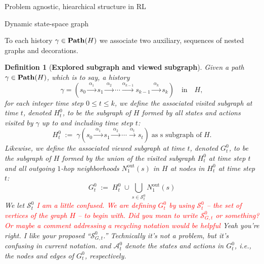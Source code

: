 \documentclass[11pt]{article}
\newtheorem{definition}[subsubsection]{Definition}
\begin{document}
\begin{section}{Problem agnostic, hiearchical structure in RL}

\begin{subsection}{Dynamic state-space graph}

To each history $\gamma\in\bold{Path}(H)$ we associate two auxiliary, sequences of nested graphs and decorations.

\begin{definition}[{\bf Explored subgraph and viewed subgraph}]
\normalfont
Given a path $\gamma\in\bold{Path}(H)$, which is to say, a history
\begin{equation}\label{eq: gamma history}
\gamma=\left(s_{0}\xrightarrow{\ \alpha_{1}\ }s_{1}\xrightarrow{\ \alpha_{2}\ }\cdots\xrightarrow{\alpha_{k-1}}s_{k-1}\xrightarrow{\ \alpha_{k}\ }s_{k}\right)\quad\text{in}\quad H,
\end{equation}
for each integer time step $0\le t\le k$, we define the associated {\em visited subgraph at time $t$}, denoted $H^{0}_{t}$, to be the subgraph of $H$ formed by all states and actions visited by $\gamma$ up to and including time step $t$:
$$
H^{0}_{t}\;:=\;\gamma\left(s_{0}\xrightarrow{\ \alpha_{1}\ }s_{1}\xrightarrow{\ \alpha_{2}\ }\cdots\xrightarrow{\ \alpha_{t}\ }s_{t}\right)\;\text{as s subgraph of}\;H.
$$
Likewise, we define the associated {\em viewed subgraph at time $t$}, denoted $G^{0}_{t}$, to be the subgraph of $H$ formed by the union of the visited subgraph $H^{0}_{t}$ at time step $t$ and all outgoing $1$-hop neighborhoods $N^{\text{out}\!}_{1}(s)$ in $H$ at nodes in $H^{0}_{t}$ at time step $t$:
$$
G^{0}_{t}
\;:=\;
H^{0}_{t}\;\cup\bigcup_{s\in \mathcal{S}^{0}_{t}}
\!\!N^{\text{out}\!}_{1}(s)
$$
We let $\mathcal{S}^{0}_{t}$ \textcolor{red}{I am a little confused. We are defining $G^0_t$ by using $\mathcal{S}^0_t$ -- the set of vertices of the graph $H$ -- to begin with. Did you mean to write $\mathcal{S}^0_{G,t}$ or something? Or maybe a comment addressing a recycling notation would be helpful} {\color{blue} Yeah you're right. I like your proposed ``$\mathcal{S}^{0}_{G,t}$.'' Technically it's not a problem, but it's confusing in current notation.} and $\mathcal{A}^{0}_{t}$ denote the states and actions in $G^{0}_{t}$, i.e., the nodes and edges of $G^{0}_{t}$, respectively.
\end{definition}

\end{subsection}
\end{section}
\end{document}
